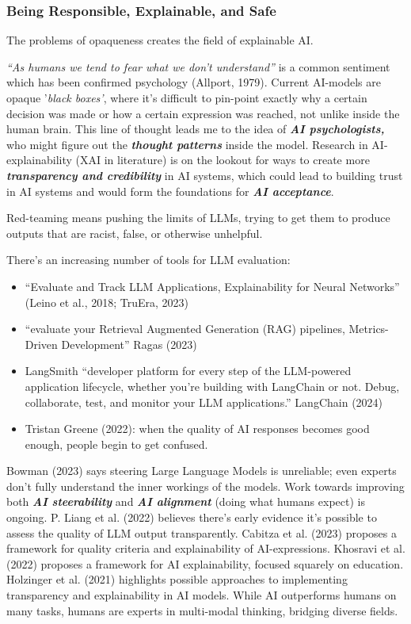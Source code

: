 \documentclass[
  letterpaper,
  DIV=11,
  numbers=noendperiod]{scrartcl}
\begin{document}
\subsubsection{Being Responsible, Explainable, and
Safe}\label{being-responsible-explainable-and-safe}

The problems of opaqueness creates the field of explainable AI.

\emph{``As humans we tend to fear what we don't understand''} is a
common sentiment which has been confirmed psychology (Allport, 1979).
Current AI-models are opaque '\emph{black boxes'}, where it's difficult
to pin-point exactly why a certain decision was made or how a certain
expression was reached, not unlike inside the human brain. This line of
thought leads me to the idea of \textbf{\emph{AI psychologists,}} who
might figure out the \textbf{\emph{thought patterns}} inside the model.
Research in AI-explainability (XAI in literature) is on the lookout for
ways to create more \textbf{\emph{transparency and credibility}} in AI
systems, which could lead to building trust in AI systems and would form
the foundations for \textbf{\emph{AI acceptance}}.

Red-teaming means pushing the limits of LLMs, trying to get them to
produce outputs that are racist, false, or otherwise unhelpful.

There's an increasing number of tools for LLM evaluation:

\begin{itemize}
\item
  ``Evaluate and Track LLM Applications, Explainability for Neural
  Networks'' (Leino et al., 2018; TruEra, 2023)
\item
  ``evaluate your Retrieval Augmented Generation (RAG) pipelines,
  Metrics-Driven Development'' Ragas (2023)
\item
  LangSmith ``developer platform for every step of the LLM-powered
  application lifecycle, whether you're building with LangChain or not.
  Debug, collaborate, test, and monitor your LLM applications.''
  LangChain (2024)
\item
  Tristan Greene (2022): when the quality of AI responses becomes good
  enough, people begin to get confused.
\end{itemize}

Bowman (2023) says steering Large Language Models is unreliable; even
experts don't fully understand the inner workings of the models. Work
towards improving both \textbf{\emph{AI steerability}} and
\textbf{\emph{AI alignment}} (doing what humans expect) is ongoing. P.
Liang et al. (2022) believes there's early evidence it's possible to
assess the quality of LLM output transparently. Cabitza et al. (2023)
proposes a framework for quality criteria and explainability of
AI-expressions. Khosravi et al. (2022) proposes a framework for AI
explainability, focused squarely on education. Holzinger et al. (2021)
highlights possible approaches to implementing transparency and
explainability in AI models. While AI outperforms humans on many tasks,
humans are experts in multi-modal thinking, bridging diverse fields.
\end{document}
